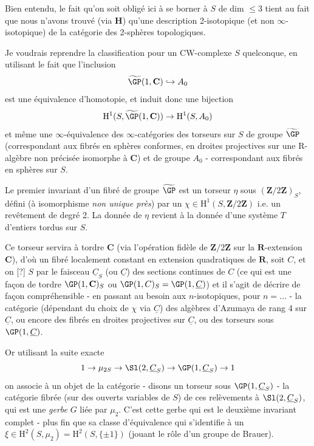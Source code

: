 Bien entendu, le fait qu'on soit obligé ici à se borner à $S$ de dim $\leq 3$ tient au fait que nous n'avons trouvé (via $\mathbf{H}$) qu'une description 2-isotopique (et non $\infty$-isotopique) de la catégorie des 2-sphères topologiques.

Je voudrais reprendre la classification pour un CW-complexe $S$ quelconque, en utilisant le fait que l'inclusion
$$
\widetilde{\GP} (1, \mathbf{C}) \hookrightarrow A_0
$$
est une équivalence d'homotopie, et induit donc une bijection
$$
\mathrm{H}^1(S, \widetilde{\GP}(1, \mathbf{C})) \to \mathrm{H}^1(S, A_0)
$$
et même une $\infty$-équivalence des $\infty$-catégories des torseurs sur $S$ de groupe $\widetilde{\GP}$ (correspondant aux fibrés en sphères conformes, en droites projectives sur une $\mathrm{R}$-algèbre non précisée isomorphe à $\mathbf{C}$) et de groupe $A_0$ - correspondant aux fibrés en sphères sur $S$.

Le premier invariant d'un fibré de groupe $\widetilde{\GP}$ est un torseur $\eta$ sous $(\mathbf{Z}/2\mathbf{Z})_S$, défini (à isomorphisme \emph{non unique près}) par un $\chi \in \mathrm{H}^1(S, \mathbf{Z}/2\mathbf{Z})$ i.e. un revêtement de degré 2. La donnée de $\eta$ revient à la donnée d'une système $T$ d'entiers tordus sur $S$.

Ce torseur servira à tordre $\mathbf{C}$ (via l'opération fidèle de $\mathbf{Z}/2\mathbf{Z}$ sur la $\mathbf{R}$-extension $\mathbf{C}$), d'où un fibré localement constant en extension quadratiques de $\mathbf{R}$, soit $C$, et on [?] $S$ par le faisceau $\underline{C}_S$ (ou $\underline{C}$) des sections continues de $C$ (ce qui est une fa\c{c}on de tordre $\GP(1, \mathbf{C})_S$ ou $\GP(1, C)_S = \GP(1, \underline{C})$) et il s'agit de décrire de fa\c{c}on compréhensible - en passant au besoin aux $n$-isotopiques, pour $n = \dots$ - la catégorie (dépendant du choix de $\chi$ via $\underline{C}$) des algèbres d'Azumaya de rang 4 sur $\underline{C}$, ou encore des fibrés en droites projectives sur $\underline{C}$, ou des torseurs sous $\GP(1, \underline{C})$.

Or utilisant la suite exacte
$$
1 \to \mu_{2 S} \to \Sl(2, \underline{C}_S) \to \GP (1, \underline{C}_S) \to 1
$$
on associe à un objet de la catégorie - disons un torseur sous $\GP (1, \underline{C}_S)$ - la catégorie fibrée (sur des ouverts variables de $S$) de ces relèvements à $\Sl(2, \underline{C}_S)$, qui est une \emph{gerbe} $G$ liée par $\mu_2$. C'est cette gerbe qui est le deuxième invariant complet - plus fin que sa classe d'équivalence qui s'identifie à un $\xi \in \mathrm{H}^2(S, \mu_2) = \mathrm{H}^2(S, \{ \pm 1 \})$ (jouant le rôle d'un groupe de Brauer).

